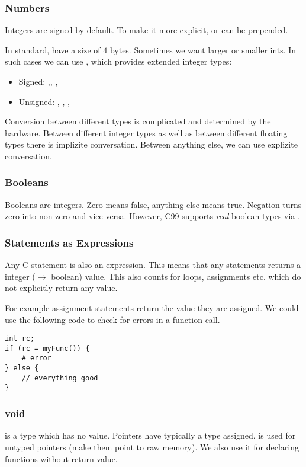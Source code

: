 \subsubsection{Numbers}
Integers are signed by default. To make it more explicit,  or  can be prepended.

In standard,  have a size of $4$ bytes. Sometimes we want larger or smaller ints. In such cases we can use , which provides extended integer types:
\begin{itemize}
    \item Signed: ,, , 
    \item Unsigned: , , , 
\end{itemize}

Conversion between different types is complicated and determined by the hardware. Between different integer types as well as between different floating types there is implizite conversation. Between anything else, we can use explizite conversation.

\subsubsection{Booleans}
Booleans are integers. Zero means false, anything else means true. Negation turns zero into non-zero and vice-versa. However, C99 supports \textit{real} boolean types via .

\subsubsection{Statements as Expressions}
Any C statement is also an expression. This means that any statements returns a integer ($\to$ boolean) value. This also counts for loops, assignments etc. which do not explicitly return any value.

For example assignment statements return the value they are assigned. We could use the following code to check for errors in a function call.
\begin{lstlisting}
int rc;
if (rc = myFunc()) {
    # error
} else {
    // everything good
}
\end{lstlisting}

\subsubsection{void}
 is a type which has no value. Pointers have typically a type assigned.  is used for untyped pointers (make them point to raw memory). We also use it for declaring functions without return value.
